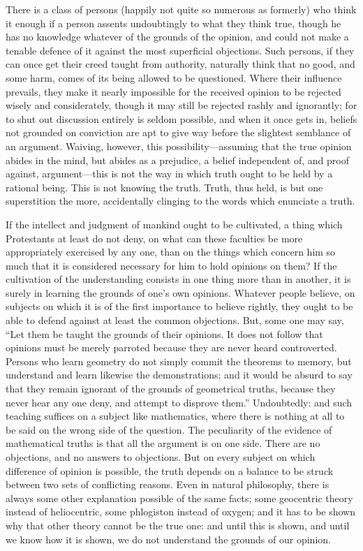 \documentclass[11pt,openany]{book}
\begin{document}
There is a class of persons (happily not quite so numerous as formerly) who think it enough if a person assents undoubtingly to what they think true, though he has no knowledge whatever of the grounds of the opinion, and could not make a tenable defence of it against the most superficial objections. Such persons, if they can once get their creed taught from authority, naturally think that no good, and some harm, comes of its being allowed to be questioned. Where their influence prevails, they make it nearly impossible for the received opinion to be rejected wisely and considerately, though it may still be rejected rashly and ignorantly; for to shut out discussion entirely is seldom possible, and when it once gets in, beliefs not grounded on conviction are apt to give way before the slightest semblance of an argument. Waiving, however, this possibility---assuming that the true opinion abides in the mind, but abides as a prejudice, a belief independent of, and proof against, argument---this is not the way in which truth ought to be held by a rational being. This is not knowing the truth. Truth, thus held, is but one superstition the more, accidentally clinging to the words which enunciate a truth.

If the intellect and judgment of mankind ought to be cultivated, a thing which Protestants at least do not deny, on what can these faculties be more appropriately exercised by any one, than on the things which concern him so much that it is considered necessary for him to hold opinions on them? If the cultivation of the understanding consists in one thing more than in another, it is surely in learning the grounds of one's own opinions. Whatever people believe, on subjects on which it is of the first importance to believe rightly, they ought to be able to defend against at least the common objections. But, some one may say, ``Let them be taught the grounds of their opinions. It does not follow that opinions must be merely parroted because they are never heard controverted. Persons who learn geometry do not simply commit the theorems to memory, but understand and learn likewise the demonstrations; and it would be absurd to say that they remain ignorant of the grounds of geometrical truths, because they never hear any one deny, and attempt to disprove them.'' Undoubtedly: and such teaching suffices on a subject like mathematics, where there is nothing at all to be said on the wrong side of the question. The peculiarity of the evidence of mathematical truths is that all the argument is on one side. There are no objections, and no answers to objections. But on every subject on which difference of opinion is possible, the truth depends on a balance to be struck between two sets of conflicting reasons. Even in natural philosophy, there is always some other explanation possible of the same facts; some geocentric theory instead of heliocentric, some phlogiston instead of oxygen; and it has to be shown why that other theory cannot be the true one: and until this is shown, and until we know how it is shown, we do not understand the grounds of our opinion.
\end{document}
